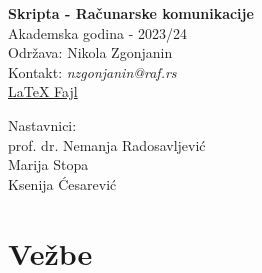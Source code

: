 \documentclass{nzcls}
\begin{document}
\vspace*{5cm}
\begin{center}
    \textbf{\Huge{Skripta - Računarske komunikacije}}\\
    \vspace{2cm}
    \large{Akademska godina - 2023/24}\\
    \vspace{5cm}
    Održava: Nikola Zgonjanin\\
    Kontakt: \emph{nzgonjanin@raf.rs}\\
    \href{https://github.com/NikolaZgonjanin/rk-skripta}{LaTeX Fajl}
    \vspace{7cm}
\end{center}
\begin{flushright}
    Nastavnici:\\
    prof. dr. Nemanja Radosavljević\\
    Marija Stopa\\
    Ksenija Ćesarević\\
\end{flushright}
\newpage
{}
\chapter{Vežbe}




\end{document}
